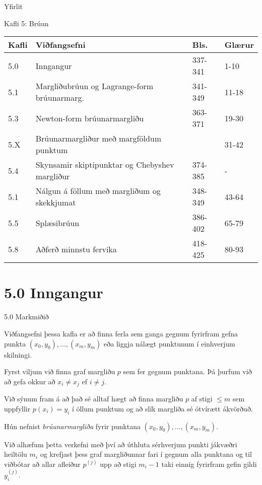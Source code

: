 \date{21, 23, 28,~og 30~janúar og 4 og 6~febrúar 2015}



\begin{frame}
	\maketitle
\end{frame}

\begin{frame}{Yfirlit}
\begin{block}{Kafli 5: Brúun}
\begin{center}
\small{
\begin{tabular}{|l|l|l|l|}\hline
Kafli &Viðfangsefni &Bls. & Glærur\\
\hline
5.0 &Inngangur &337-341 & 1-10\\
5.1 &Margliðubrúun og Lagrange-form brúunarmarg. & 341-349 & 11-18\\
5.3 &Newton-form brúunarmargliðu & 363-371 & 19-30\\
5.X &Brúunarmargliður með margföldum punktum & & 31-42\\
5.4 & Skynsamir skiptipunktar og Chebyshev margliður & 374-385 & -\\
5.1 & Nálgun á föllum með margliðum og skekkjumat & 348-349 & 43-64\\
5.5 &Splæsibrúun& 386-402 & 65-79\\
5.8 & Aðferð minnstu fervika& 418-425 & 80-93\\
\hline
\end{tabular}
}
\end{center}
\end{block}
\end{frame}

\section*{5.0  	Inngangur}
\begin{frame}{5.0 Markmiðið} 

Viðfangsefni þessa kafla er að finna ferla sem ganga gegnum fyrirfram
gefna punkta $(x_0,y_0),\dots,(x_m,y_m)$ eða liggja nálægt punktunum í
einhverjum skilningi.

\pause
\smallskip
Fyrst viljum við finna graf margliðu $p$ sem 
fer gegnum punktana.  Þá þurfum við að gefa okkur
að $x_i\neq x_j$ ef $i\neq j$.  

\pause
\smallskip
Við sýnum fram á 
að það sé alltaf hægt að finna margliðu $p$ af stigi $\leq m$ sem
uppfyllir  $p(x_i)=y_i$ í  öllum punktum
og að slík  margliða sé ótvírætt
ákvörðuð.

\pause
\smallskip
Hún nefnist {\it brúunarmargliða} fyrir punktana
$(x_0,y_0),\dots,(x_m,y_m)$. 

\pause
\smallskip
Við alhæfum þetta verkefni með því 
að úthluta sérhverjum punkti jákvæðri heiltölu $m_i$ og krefjast
þess graf margliðunnar fari í gegnum alla punktana og til viðbótar
að allar afleiður $p^{(j)}$ upp að  stigi $m_i-1$ taki einnig fyrirfram
gefin gildi $y^{(j)}_i$.  
\end{frame}

